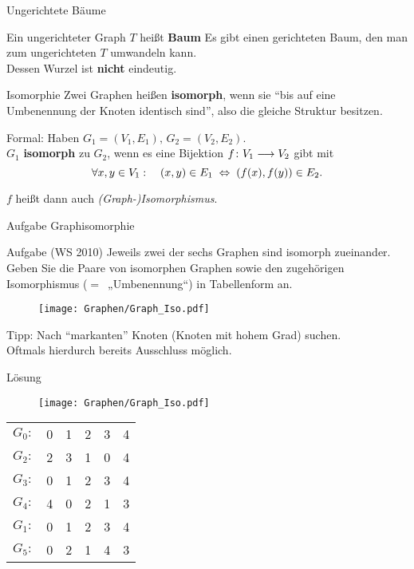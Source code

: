\begin{frame}{Ungerichtete Bäume}
	\begin{Definition}
		Ein ungerichteter Graph $T$ heißt \textbf{Baum} \Gdw Es gibt einen gerichteten Baum, den man zum ungerichteten $T$ umwandeln kann. \\
		\smallskip
		Dessen Wurzel ist \textbf{nicht} eindeutig.
		
	\end{Definition}
\end{frame}

\begin{frame}{Isomorphie}
	Zwei Graphen heißen \textbf{isomorph}, wenn sie \enquote{bis auf eine Umbenennung der Knoten identisch sind}, also die gleiche Struktur besitzen.\\
	
	\pause
	\medskip
	
	Formal: Haben $G_1 = (V_1, E_1), \, G_2 = (V_2, E_2)$. \\
	$G_1$ \textbf{isomorph} zu $G_2$, wenn es eine Bijektion $f \colon V_1 \longrightarrow V_2$ gibt mit \[\forall x,y \in V_1: \quad (x,y) \in E_1 \gdw \tuple{f(x),f(y)} \in E_2. \]
	
	$f$ heißt dann auch \emph{(Graph-)Isomorphismus}.
	
\end{frame}

\begin{frame}{Aufgabe Graphisomorphie}
	\begin{block}{Aufgabe (WS 2010)}
		Jeweils zwei der sechs Graphen sind isomorph zueinander. Geben Sie die Paare von isomorphen Graphen sowie den zugehörigen Isomorphismus ($=$~„Umbenennung“) in Tabellenform an.
		\begin{figure}[H]
			\centering
			\texttt{[image: Graphen/Graph\_Iso.pdf]}
		\end{figure}
	\end{block}
	Tipp: Nach \enquote{markanten} Knoten (Knoten mit hohem Grad) suchen.\\
	Oftmals hierdurch bereits Ausschluss möglich.
\end{frame}

\begin{frame}{Lösung}
	\begin{figure}[H]
		\centering
		\texttt{[image: Graphen/Graph\_Iso.pdf]}
	\end{figure}
	\begin{table}[H]
		\centering
		\begin{tabular}{c|c|c|c|c|c}
			$G_0: $ & 0 & 1 & 2 & 3 & 4 \\
			$G_2: $ & 2 & 3 & 1 & 0 & 4 \\[1em]
			$G_3: $ & 0 & 1 & 2 & 3 & 4 \\
			$G_4: $ & 4 & 0 & 2 & 1 & 3 \\[1em]
			$G_1: $ & 0 & 1 & 2 & 3 & 4 \\
			$G_5: $ & 0 & 2 & 1 & 4 & 3 \\
		\end{tabular}
	\end{table}
\end{frame}


